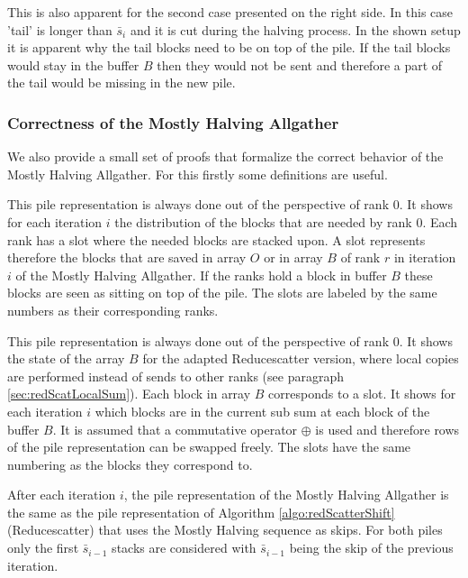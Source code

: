 This is  also  apparent for the second case presented on the right side. In this case 'tail' is longer than $\bar{s}_i$ and it is cut during the halving process. In the shown setup it is apparent why the tail blocks need to be on top of the pile. If the tail blocks would stay in the buffer $B$ then they would not be sent and therefore a part of the tail would be missing in the new pile.

\subsubsection{Correctness of the Mostly Halving Allgather}
We also provide a small set of proofs that formalize the correct behavior of the Mostly Halving Allgather. For this firstly some definitions are useful.
\begin{definition}
	This pile representation is always done out of the perspective of rank 0. It shows for each iteration $i$ the distribution of the blocks that are needed by rank 0. Each rank has a slot where the needed blocks are stacked upon. A slot represents therefore the blocks that are saved in array $O$ or in array $B$ of rank $r$ in iteration $i$ of the Mostly Halving Allgather. If the ranks hold a block in buffer $B$ these blocks are seen as sitting on top of the pile. The slots are labeled by the same numbers as their corresponding ranks.
\end{definition}
\begin{definition}
	This pile representation is always done out of the perspective of rank 0. It shows the state of the array $B$ for the adapted Reducescatter version, where local copies are performed instead of sends to other ranks (see paragraph \ref{sec:redScatLocalSum}). Each block in array $B$ corresponds to a slot. It shows for each iteration $i$ which blocks are in the current sub sum at each block of the buffer $B$. It is assumed that a commutative operator $\oplus$ is used and therefore rows of the pile representation can be swapped freely. The slots have the same numbering as the blocks they correspond to.
\end{definition}
\begin{lemma}
	After each iteration $i$, the pile representation of the Mostly Halving Allgather is the same as the pile representation of Algorithm \ref{algo:redScatterShift} (Reducescatter) that uses the Mostly Halving sequence as skips. For both piles only the first $\bar{s}_{i-1}$ stacks are considered with $\bar{s}_{i-1}$ being the skip of the previous iteration. 
\end{lemma}

